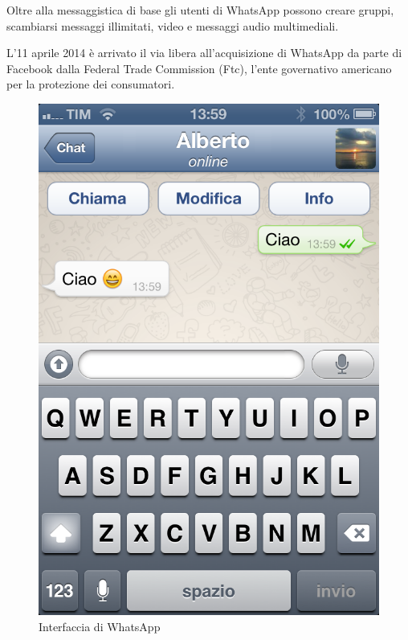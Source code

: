 \documentclass[a4paper,11pt]{book}
\begin{document}
Oltre alla messaggistica di base gli utenti di WhatsApp possono creare gruppi, scambiarsi messaggi illimitati, video e messaggi audio multimediali.

L'11 aprile 2014 \`e arrivato il via libera all'acquisizione di WhatsApp da parte di Facebook dalla Federal Trade Commission (Ftc), l'ente governativo americano per la protezione dei consumatori.

\begin{figure}[!ht]
\centering
\includegraphics[scale = 0.3]{Whatsapp.png}
\caption{Interfaccia di WhatsApp}
\end{figure}


\clearpage
\end{document}
